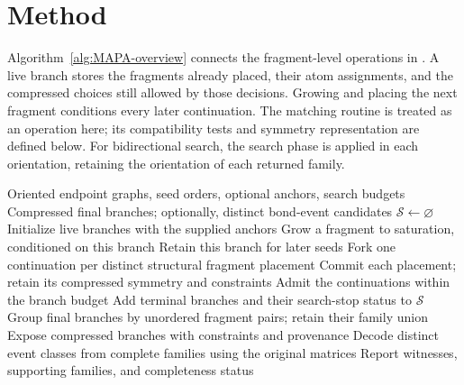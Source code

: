 \section{Method}


Algorithm~\ref{alg:MAPA-overview} connects the fragment-level operations in . A live branch stores the fragments already placed, their atom assignments, and the compressed choices still allowed by those decisions. Growing and placing the next fragment conditions every later continuation. The matching routine is treated as an operation here; its compatibility tests and symmetry representation are defined below. For bidirectional search, the search phase is applied in each orientation, retaining the orientation of each returned family.

\begin{algorithm}[t]
\caption{MAPA: from fragment growth to alternative bond-event candidates}
\label{alg:MAPA-overview}
\small
\begin{algorithmic}[1]
\REQUIRE Oriented endpoint graphs, seed orders, optional anchors, search budgets
\ENSURE Compressed final branches; optionally, distinct bond-event candidates
\STATE $\mathcal S\gets\varnothing$ 
    \STATE Initialize live branches with the supplied anchors
    \REPEAT
          \STATE Grow a fragment to saturation, conditioned on this branch 
            \STATE Retain this branch for later seeds
          \ELSE
            \STATE Fork one continuation per distinct structural fragment placement
            \STATE Commit each placement; retain its compressed symmetry and constraints
            \STATE Admit the continuations within the branch budget
          \ENDIF
        \ENDFOR
      \ENDFOR
    \STATE Add terminal branches and their search-stop status to $\mathcal S$
  \ENDFOR
\ENDFOR
\STATE Group final branches by unordered fragment pairs; retain their family union
\STATE Expose compressed branches with constraints and provenance
  \STATE Decode distinct event classes from complete families using the original matrices
  \STATE Report witnesses, supporting families, and completeness status 
\ENDIF
\end{algorithmic}
\end{algorithm}

